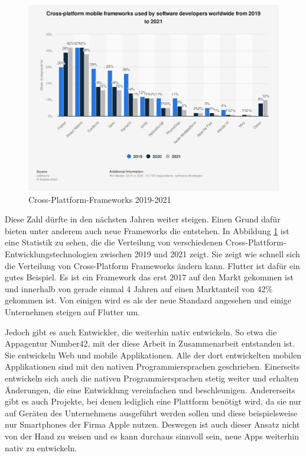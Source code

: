 \begin{figure}[ht]
  \centering
  \includegraphics[width=15cm,keepaspectratio]{images/cross-platform-mobile-frameworks.png} 
  \caption[Statistik Cross-Plattform-Frameworks]{Cross-Plattform-Frameworks 2019-2021 \cite{statist_CP_Framework}}
  \label{fig:statista_cross_plattform}
\end{figure}

Diese Zahl dürfte in den nächsten Jahren weiter steigen. Einen Grund dafür bieten unter anderem auch neue Frameworks die entstehen. In Abbildung \ref{fig:statista_cross_plattform} ist eine Statistik zu sehen, die die Verteilung von verschiedenen Cross-Plattform-Entwicklungstechnologien zwischen 2019 und 2021 zeigt. Sie zeigt wie schnell sich die Verteilung von Cross-Platform Frameworks ändern kann. Flutter ist dafür ein gutes Beispiel. Es ist ein Framework das erst 2017 auf den Markt gekommen ist und innerhalb von gerade einmal 4 Jahren auf einen Marktanteil von 42\% gekommen ist. Von einigen wird es als der neue Standard angesehen und einige Unternehmen steigen auf Flutter um. 

Jedoch gibt es auch Entwickler, die weiterhin nativ entwickeln. So etwa die Appagentur Number42, mit der diese Arbeit in Zusammenarbeit entstanden ist. Sie entwickeln Web und mobile Applikationen. Alle der dort entwickelten mobilen Applikationen sind mit den nativen Programmiersprachen geschrieben. Einerseits entwickeln sich auch die nativen Programmiersprachen stetig weiter und erhalten Änderungen, die eine Entwicklung vereinfachen und beschleunigen. Andererseits gibt es auch Projekte, bei denen lediglich eine Plattform benötigt wird, da sie nur auf Geräten des Unternehmens ausgeführt werden sollen und diese beispielsweise nur Smartphones der Firma Apple nutzen. Deswegen ist auch dieser Ansatz nicht von der Hand zu weisen und es kann durchaus sinnvoll sein, neue Apps weiterhin nativ zu entwickeln.

